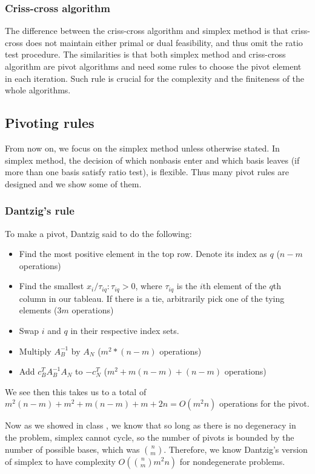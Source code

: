 \documentclass[11pt]{article}
\begin{document}
\subsubsection{Criss-cross algorithm}
The difference between the criss-cross algorithm and simplex method is that criss-cross does not maintain either primal or dual feasibility, and thus omit the ratio test procedure. The similarities is that both simplex method and criss-cross algorithm are pivot algorithms and need some rules to choose the pivot element in each iteration. Such rule is crucial for the complexity and the finiteness of the whole algorithms. 
 
\subsection{Pivoting rules}
From now on, we focus on the simplex method unless otherwise stated. In simplex method, the decision of which nonbasis enter and which basis leaves (if more than one basis satisfy ratio test), is flexible. Thus many pivot rules are designed and we show some of them. 
\subsubsection{Dantzig's rule}
To make a pivot, Dantzig said to do the following:
\begin{itemize}
	\item Find the most positive element in the top row. Denote its index as $q$ ($n-m$ operations)
	\item Find the smallest $x_i/ \tau_{iq} : \tau_{iq} > 0$, where $\tau_{iq}$ is the $i$th element of the $q$th column in our tableau. If there is a tie, arbitrarily pick one of the tying elements ($3m$ operations)
	\item Swap $i$ and $q$ in their respective index sets.
	\item Multiply $A_B^{-1}$ by $A_N$ ($m^2*(n-m)$ operations)
	\item Add $c_B^T A_B^{-1} A_N$ to $-c_N^T$ ($m^2 + m(n-m) + (n-m)$ operations)
\end{itemize}
We see then this takes us to a total of $m^2 (n - m) + m^2 + m (n - m) + m + 2 n = O(m^2n)$ operations for the pivot.

Now as we showed in class \cite{class}, we know that so long as there is no degeneracy in the problem, simplex cannot cycle, so the number of pivots is bounded by the number of possible bases, which was $\binom{n}{m}$. Therefore, we know Dantzig's version of simplex to have complexity $O(\binom{n}{m}m^2n)$ for nondegenerate problems.
\end{document}
